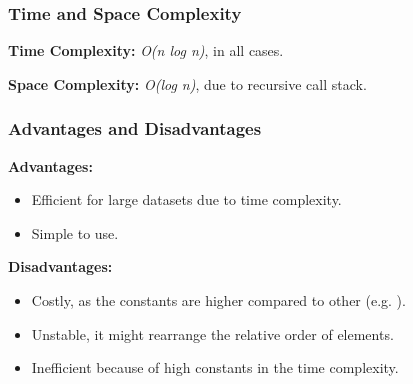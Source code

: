 \subsubsection*{Time and Space Complexity}

\textbf{Time Complexity:} \textit{O(n log n)}, in all cases.

\textbf{Space Complexity:} \textit{O(log n)}, due to recursive call stack.

\subsubsection*{Advantages and Disadvantages}

\textbf{Advantages:}

\begin{itemize}
  \item Efficient for large datasets due to time complexity.
  \item Simple to use.
\end{itemize}

\textbf{Disadvantages:}

\begin{itemize}
  \item Costly, as the constants are higher compared to other (e.g. \mergesrt).
  \item Unstable, it might rearrange the relative order of elements.
  \item Inefficient because of high constants in the time complexity.
\end{itemize}
